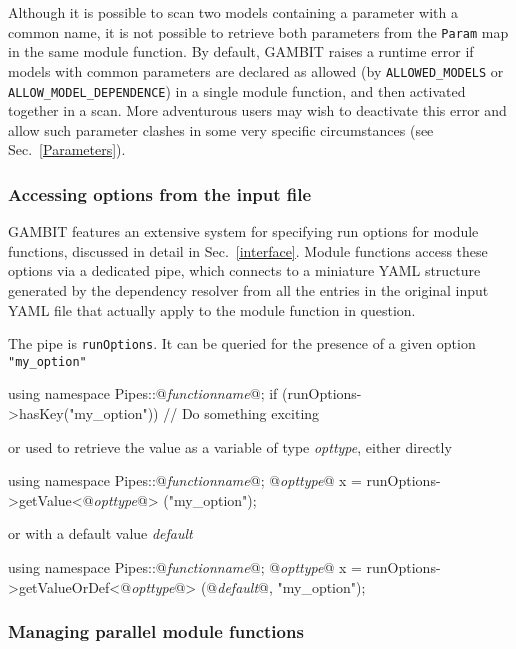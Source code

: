 \documentclass[pdftex,twocolumn,epjc3_preprint,runningheads]{svjour3}
\renewcommand{\_}{\discretionary{\underscore}{}{\underscore}}
\newcommand\cpp[1]{{\lstinline!#1!}}  %
\newcommand{\metavarf}[1]{\textit{\color{darkgreen}\footnotesize\textrm{#1}}}
\newcommand{\metavar}{\metavarf}
\newcommand{\gambit}{\textsf{GAMBIT}\xspace}
\newcommand{\GB}{\gambit}
\newcommand\YAML{\textsf{YAML}\xspace}
\begin{document}
Although it is possible to scan two models containing a parameter with a common name, it is not possible to retrieve both parameters from the \lstinline{Param} map in the same module function.  By default, \GB raises a runtime error if models with common parameters are declared as allowed (by \lstinline{ALLOWED_MODELS} or \lstinline{ALLOW_MODEL_DEPENDENCE}) in a single module function, and then activated together in a scan.  More adventurous users may wish to deactivate this error and allow such parameter clashes in some very specific circumstances (see Sec.\ \ref{Parameters}).

\subsubsection{Accessing options from the input file}
\label{module_options}

\GB features an extensive system for specifying run options for module functions, discussed in detail in Sec.\ \ref{interface}.  Module functions access these options via a dedicated pipe, which connects to a miniature \YAML structure generated by the dependency resolver from all the entries in the original input \YAML file that actually apply to the module function in question.

The pipe is \lstinline{runOptions}.  It can be queried for the presence of a given option \cpp{"my_option"}
\begin{lstcpp}
using namespace Pipes::@\metavar{function\_name}@;
if (runOptions->hasKey("my_option"))
{
  // Do something exciting
}
\end{lstcpp}
or used to retrieve the value as a variable of type \mbox{\metavar{opt\_type},} either directly
\begin{lstcpp}
using namespace Pipes::@\metavar{function\_name}@;
@\metavar{opt\_type}@ x = runOptions->getValue<@\metavar{opt\_type}@>
 ("my_option");
\end{lstcpp}
or with a default value \metavar{default}
\begin{lstcpp}
using namespace Pipes::@\metavar{function\_name}@;
@\metavar{opt\_type}@ x = runOptions->getValueOrDef<@\metavar{opt\_type}@>
 (@\metavar{default}@, "my_option");
\end{lstcpp}

\subsubsection{Managing parallel module functions}
\label{loopmanagement}
\end{document}
